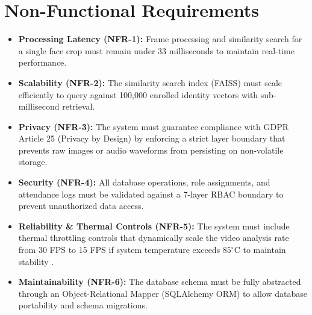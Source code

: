 \documentclass[12pt,a4paper,oneside]{report}
\begin{document}
\section{Non-Functional Requirements}
\begin{itemize}
    \item \textbf{Processing Latency (NFR-1):} Frame processing and similarity search for a single face crop must remain under 33 milliseconds to maintain real-time performance.
    \item \textbf{Scalability (NFR-2):} The similarity search index (FAISS) must scale efficiently to query against 100,000 enrolled identity vectors with sub-millisecond retrieval.
    \item \textbf{Privacy (NFR-3):} The system must guarantee compliance with GDPR Article 25 (Privacy by Design) by enforcing a strict layer boundary that prevents raw images or audio waveforms from persisting on non-volatile storage.
    \item \textbf{Security (NFR-4):} All database operations, role assignments, and attendance logs must be validated against a 7-layer RBAC boundary to prevent unauthorized data access.
    \item \textbf{Reliability \& Thermal Controls (NFR-5):} The system must include thermal throttling controls that dynamically scale the video analysis rate from 30 FPS to 15 FPS if system temperature exceeds $85^\circ\text{C}$ to maintain stability \cite{mbeee2026}.
    \item \textbf{Maintainability (NFR-6):} The database schema must be fully abstracted through an Object-Relational Mapper (SQLAlchemy ORM) to allow database portability and schema migrations.
\end{itemize}
\end{document}
